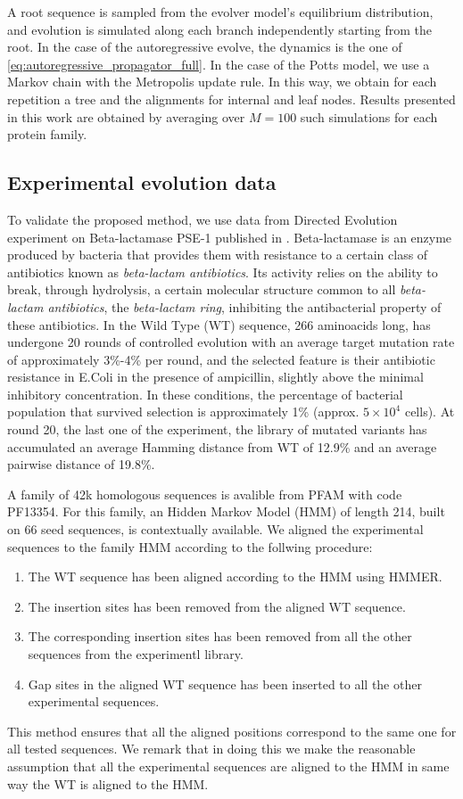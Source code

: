 A root sequence is sampled from the evolver model's equilibrium distribution, and evolution is simulated along each branch independently starting from the root. 
In the case of the autoregressive evolve, the dynamics is the one of \eqref{eq:autoregressive_propagator_full}. 
In the case of the Potts model, we use a Markov chain with the Metropolis update rule. 
In this way, we obtain for each repetition a tree and the alignments for internal and leaf nodes. 
Results presented in this work are obtained by averaging over $M=100$ such simulations for each protein family. 

\subsection{Experimental evolution data}

To validate the proposed method, we use data from Directed Evolution experiment on Beta-lactamase PSE-1 published in \cite{stiffler_proteinstructureexperimental_2020}.
Beta-lactamase is an enzyme produced by bacteria that provides them with resistance to a certain class of antibiotics known as \textit{beta-lactam antibiotics}. Its activity relies on the ability to break, through hydrolysis, a certain molecular structure common to all \textit{beta-lactam antibiotics}, the \textit{beta-lactam ring}, inhibiting the antibacterial property of these antibiotics.
In \cite{stiffler_proteinstructureexperimental_2020} the Wild Type (WT) sequence, 266 aminoacids long, has undergone 20 rounds of controlled evolution with an average target mutation rate of approximately 3\%-4\% per round, and the selected feature is their antibiotic resistance in E.Coli in the presence of ampicillin, slightly above the minimal inhibitory concentration. In these conditions, the percentage of bacterial population that survived selection is approximately 1\% (approx. $5 \times 10^4$ cells).
At round 20, the last one of the experiment, the library of mutated variants has accumulated an average Hamming distance from WT of 12.9\% and an average pairwise distance of 19.8\%.

A family of 42k homologous sequences is avalible from PFAM with code PF13354.
For this family, an Hidden Markov Model (HMM) of length 214, built on 66 seed sequences, is contextually available.
We aligned the experimental sequences to the family HMM according to the follwing procedure:
\begin{enumerate}
	\item The WT sequence has been aligned according to the HMM using HMMER.
	\item The insertion sites has been removed from the aligned WT sequence.
	\item The corresponding insertion sites has been removed from all the other sequences from the experimentl library.
	\item Gap sites in the aligned WT sequence has been inserted to all the other experimental sequences.
\end{enumerate}
This method ensures that all the aligned positions correspond to the same one for all tested sequences. We remark that in doing this we make the reasonable assumption that all the experimental sequences are aligned to the HMM in same way the WT is aligned to the HMM.

